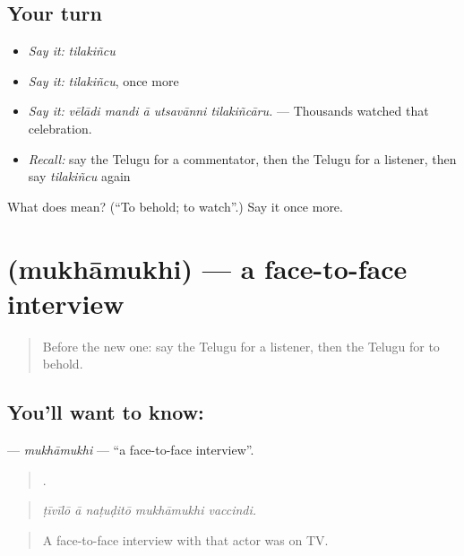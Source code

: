 \subsection*{Your turn}
\begin{itemize}
\raggedright
  \item \emph{Say it:} \emph{tilakiñcu}
  \item \emph{Say it:} \emph{tilakiñcu}, once more
  \item \emph{Say it:} \emph{vēlādi mandi ā utsavānni tilakiñcāru.} — Thousands watched that celebration.
  \item \emph{Recall:} say the Telugu for a commentator, then the Telugu for a listener, then say \emph{tilakiñcu} again
\end{itemize}

\begin{tcolorbox}[breakable,colback=teal!4,colframe=teal!35!black,title={Before you move on}]
What does  mean? (\textquotedblleft{}To behold; to watch\textquotedblright{}.) Say it once more.
\end{tcolorbox}
\section[\texorpdfstring{\te{ముఖాముఖి} (mukhāmukhi)}{ముఖాముఖి (mukhāmukhi)}]{ (mukhāmukhi) — a face-to-face interview}

\label{lesson:TE-C374-mukhamukhi}



\begin{quote}
Before the new one: say the Telugu for a listener, then the Telugu for to behold.
\end{quote}

\subsection*{You'll want to know: }
\textbf{} — \emph{mukhāmukhi} — \textquotedblleft{}a face-to-face interview\textquotedblright{}.

\begin{quote}
    .
\end{quote}

\begin{quote}
\emph{ṭīvīlō ā naṭuḍitō mukhāmukhi vaccindi.}
\end{quote}

\begin{quote}
A face-to-face interview with that actor was on TV.
\end{quote}

